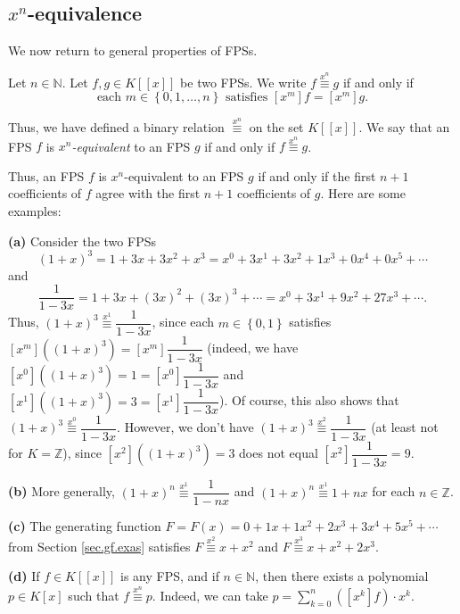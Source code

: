 \subsection{\label{sec.gf.xneq}$x^{n}$-equivalence}

We now return to general properties of FPSs.

\begin{definition}
\label{def.fps.xneq}Let $n\in\mathbb{N}$. Let $f,g\in K\left[  \left[
x\right]  \right]  $ be two FPSs. We write $f\overset{x^{n}}{\equiv}g$ if and
only if%
\[
\text{each }m\in\left\{  0,1,\ldots,n\right\}  \text{ satisfies }\left[
x^{m}\right]  f=\left[  x^{m}\right]  g.
\]


Thus, we have defined a binary relation $\overset{x^{n}}{\equiv}$ on the set
$K\left[  \left[  x\right]  \right]  $. We say that an FPS $f$ is $x^{n}%
$\emph{-equivalent} to an FPS $g$ if and only if $f\overset{x^{n}}{\equiv}g$.
\end{definition}

Thus, an FPS $f$ is $x^{n}$-equivalent to an FPS $g$ if and only if the first
$n+1$ coefficients of $f$ agree with the first $n+1$ coefficients of $g$. Here
are some examples:

\begin{example}
\textbf{(a)} Consider the two FPSs
\[
\left(  1+x\right)  ^{3}=1+3x+3x^{2}+x^{3}=x^{0}+3x^{1}+3x^{2}+1x^{3}%
+0x^{4}+0x^{5}+\cdots
\]
and%
\[
\dfrac{1}{1-3x}=1+3x+\left(  3x\right)  ^{2}+\left(  3x\right)  ^{3}%
+\cdots=x^{0}+3x^{1}+9x^{2}+27x^{3}+\cdots.
\]
Thus, $\left(  1+x\right)  ^{3}\overset{x^{1}}{\equiv}\dfrac{1}{1-3x}$, since
each $m\in\left\{  0,1\right\}  $ satisfies $\left[  x^{m}\right]  \left(
\left(  1+x\right)  ^{3}\right)  =\left[  x^{m}\right]  \dfrac{1}{1-3x}$
(indeed, we have $\left[  x^{0}\right]  \left(  \left(  1+x\right)
^{3}\right)  =1=\left[  x^{0}\right]  \dfrac{1}{1-3x}$ and $\left[
x^{1}\right]  \left(  \left(  1+x\right)  ^{3}\right)  =3=\left[
x^{1}\right]  \dfrac{1}{1-3x}$). Of course, this also shows that $\left(
1+x\right)  ^{3}\overset{x^{0}}{\equiv}\dfrac{1}{1-3x}$. However, we don't
have $\left(  1+x\right)  ^{3}\overset{x^{2}}{\equiv}\dfrac{1}{1-3x}$ (at
least not for $K=\mathbb{Z}$), since $\left[  x^{2}\right]  \left(  \left(
1+x\right)  ^{3}\right)  =3$ does not equal $\left[  x^{2}\right]  \dfrac
{1}{1-3x}=9$. \medskip

\textbf{(b)} More generally, $\left(  1+x\right)  ^{n}\overset{x^{1}}{\equiv
}\dfrac{1}{1-nx}$ and $\left(  1+x\right)  ^{n}\overset{x^{1}}{\equiv}1+nx$
for each $n\in\mathbb{Z}$. \medskip

\textbf{(c)} The generating function $F=F\left(  x\right)  =0+1x+1x^{2}%
+2x^{3}+3x^{4}+5x^{5}+\cdots$ from Section \ref{sec.gf.exas} satisfies
$F\overset{x^{2}}{\equiv}x+x^{2}$ and $F\overset{x^{3}}{\equiv}x+x^{2}+2x^{3}%
$. \medskip

\textbf{(d)} If $f\in K\left[  \left[  x\right]  \right]  $ is any FPS, and if
$n\in\mathbb{N}$, then there exists a polynomial $p\in K\left[  x\right]  $
such that $f\overset{x^{n}}{\equiv}p$. Indeed, we can take $p=\sum_{k=0}%
^{n}\left(  \left[  x^{k}\right]  f\right)  \cdot x^{k}$.
\end{example}

